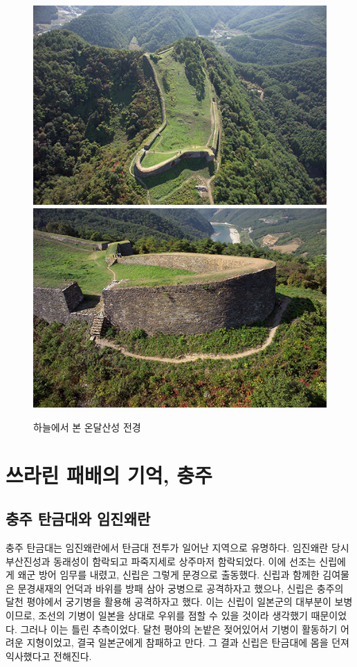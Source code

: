 \begin{figure}[ht]
    \centering
    \includegraphics[width=.4\textwidth]{s_img/온달산성_사진.JPG}
    \includegraphics[width=.4\textwidth]{s_img/온달산성_사진2.JPG}
    \caption{하늘에서 본 온달산성 전경}
    \label{fig:my_label_s5}
 \end{figure}

\section{쓰라린 패배의 기억, 충주}
\subsection{충주 탄금대와 임진왜란}
충주 탄금대는 임진왜란에서 탄금대 전투가 일어난 지역으로 유명하다. 임진왜란 당시 부산진성과 동래성이 함락되고 파죽지세로 상주마저 함락되었다. 이에 선조는 신립에게 왜군 방어 임무를 내렸고, 신립은 그렇게 문경으로 출동했다. 신립과 함께한 김여물은 문경새재의 언덕과 바위를 방패 삼아 궁병으로 공격하자고 했으나, 신립은 충주의 달천 평야에서 궁기병을 활용해 공격하자고 했다. 이는 신립이 일본군의 대부분이 보병이므로, 조선의 기병이 일본을 상대로 우위를 점할 수 있을 것이라 생각했기 때문이었다. 그러나 이는 틀린 추측이었다. 달천 평야의 논밭은 젖어있어서 기병이 활동하기 어려운 지형이었고, 결국 일본군에게 참패하고 만다. 그 결과 신립은 탄금대에 몸을 던져 익사했다고 전해진다. 
